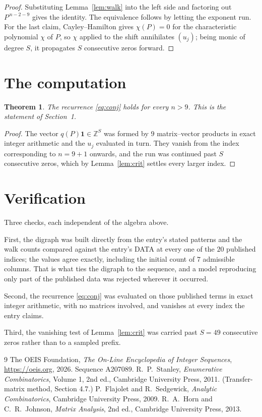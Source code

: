 \documentclass[11pt,a4paper]{article}
\theoremstyle{plain}
\newtheorem{theorem}{Theorem}
\theoremstyle{definition}
\begin{document}
\begin{proof}
Substituting Lemma~\ref{lem:walk} into the left side and factoring out
$P^{\,n-2-9}$ gives the identity. The equivalence follows by letting the exponent
run. For the last claim, Cayley--Hamilton gives $\chi(P)=0$ for the characteristic
polynomial $\chi$ of $P$, so $\chi$ applied to the shift annihilates $(u_j)$; being monic of
degree $S$, it propagates $S$ consecutive zeros forward.
\end{proof}

\section{The computation}

\begin{theorem}
The recurrence \eqref{eq:conj} holds for every $n>9$. This is the statement of
Section~1.
\end{theorem}

\begin{proof}
The vector $q(P)\mathbf{1}\in\mathbb{Z}^{S}$ was formed by $9$ matrix--vector
products in exact integer arithmetic and the $u_j$ evaluated in turn. They vanish from the
index corresponding to $n=9+1$ onwards, and the run was continued past $S$ consecutive
zeros, which by Lemma~\ref{lem:crit} settles every larger index.
\end{proof}

\section{Verification}

Three checks, each independent of the algebra above.

First, the digraph was built directly from the entry's stated patterns and the walk counts
compared against the entry's DATA at every one of the $20$ published indices; the
values agree exactly, including the initial count of $7$ admissible columns. That is
what ties the digraph to the sequence, and a model reproducing only part of the published
data was rejected wherever it occurred.

Second, the recurrence \eqref{eq:conj} was evaluated on those published terms in exact
integer arithmetic, with no matrices involved, and vanishes at every index the entry claims.

Third, the vanishing test of Lemma~\ref{lem:crit} was carried past $S=49$ consecutive
zeros rather than to a sampled prefix.

\begin{thebibliography}{9}
 The OEIS Foundation, \emph{The On-Line Encyclopedia of Integer
Sequences}, \url{https://oeis.org}, 2026. Sequence A207089.
 R.~P.~Stanley, \emph{Enumerative Combinatorics}, Volume 1, 2nd ed.,
Cambridge University Press, 2011. (Transfer-matrix method, Section 4.7.)
 P.~Flajolet and R.~Sedgewick, \emph{Analytic Combinatorics}, Cambridge
University Press, 2009.
 R.~A.~Horn and C.~R.~Johnson, \emph{Matrix Analysis}, 2nd ed., Cambridge
University Press, 2013.
\end{thebibliography}
\end{document}
